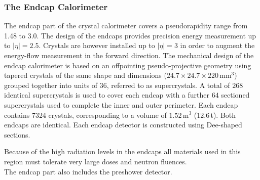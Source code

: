 \subsubsection{The Endcap Calorimeter}
The endcap part of the crystal calorimeter covers a pseudorapidity range from 1.48 to 3.0. The design of the endcaps provides precision energy measurement up to $|\eta| = 2.5$. Crystals are however installed up to $|\eta| = 3$ in order to augment the energy-flow measurement in the forward direction.  The mechanical design of the endcap calorimeter is based on an offpointing pseudo-projective geometry using tapered crystals of the same shape and dimensions ($24.7 \times 24.7 \times 220 \,$mm$^3$) grouped together into units of $36$, referred to as supercrystals. A total of $268$ identical supercrystals is used to cover each endcap with a further $64$ sectioned supercrystals used to complete the inner and outer perimeter. Each endcap contains 7324 crystals, corresponding to a volume of $1.52 \,$m$^3$ ($12.6 \,$t). Both endcaps are identical. Each endcap detector is constructed using Dee-shaped sections.

Because of the high radiation levels in the endcaps all materials used in this region must tolerate very large doses and neutron fluences.  \\
The endcap part also includes the preshower detector. 


